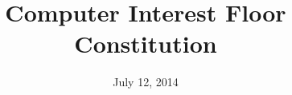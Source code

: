 \documentclass[12pt]{article}
\title{Computer Interest Floor Constitution}
\date{July 12, 2014}
\begin{document}
\maketitle
\tableofcontents

\pagebreak










\end{document}
